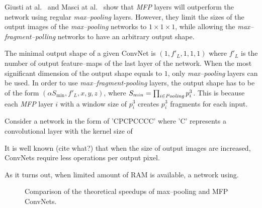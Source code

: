 \documentclass[conference]{IEEEtran}
\begin{document}
  Giusti at al.~\cite{giusti2013fast} and Masci at
  al.~\cite{masci2013fast} show that \emph{MFP}
  layers will outperform the network using regular \emph{max--pooling}
  layers.  However, they limit the sizes of the output images of the
  \emph{max--pooling} networks to $1 \times 1 \times 1$, while
  allowing the \emph{max--fragment--polling} networks to have an
  arbitrary output shape.

  The minimal output shape of a given ConvNet is $(1,f'_L,1,1,1)$
  where $f'_L$ is the number of output feature--maps of the last layer
  of the network.  When the most significant dimension of the output
  shape equals to $1$, only \emph{max--pooling} layers can be used.
  In order to use \emph{max--fragment-pooling} layers, the output
  shape has to be of the form $(\alpha S_{\min},f'_L,x,y,z)$, where
  $S_{min} = \prod_{i \in \id{Pooling}} p^3_i$.  This is because each
  \emph{MFP} layer $i$ with a window size of
  $p_i^3$ creates $p_i^3$ fragments for each input.

  Consider a network in the form of 'CPCPCCCC' where 'C' represents a
  convolutional layer with the kernel size of

  It is well known (cite what?) that when the size of output images
  are increased, ConvNets require less operations per output pixel.

  As it turns out, when limited amount of RAM is available, a network
  using.


  \begin{figure}
    \centering
    \caption{Comparison of the theoretical speedups of max--pooling
      and MFP ConvNets.}
    \label{fig:sparse_explanation}
  \end{figure}
\end{document}
